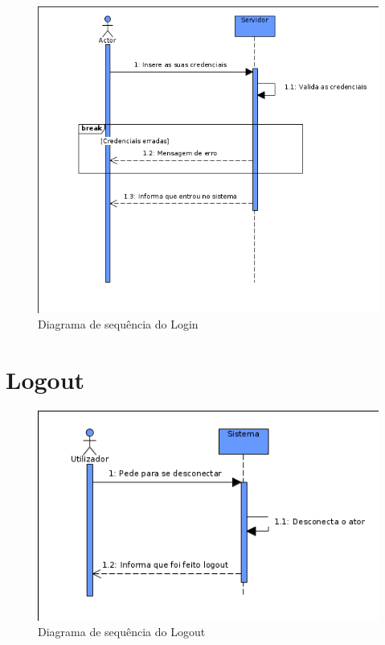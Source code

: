 \documentclass[a4paper]{report}
\begin{document}
\begin{figure}[H]
	\centering 
    \includegraphics[width=\textwidth]{images/loginSeq.png}  
    \caption{Diagrama de sequência do Login}
\end{figure}

\section{Logout}

\begin{figure}[H]
	\centering 
    \includegraphics[width=\textwidth]{images/logoutSeq.png}  
    \caption{Diagrama de sequência do Logout}
\end{figure}
\end{document}
